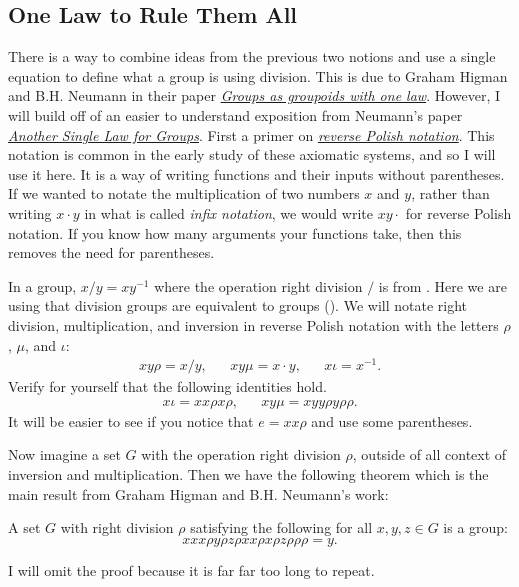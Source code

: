 \documentclass{article}
\begin{document}
\subsection*{One Law to Rule Them All}

There is a way to combine ideas from the previous two notions and use a single equation to define what a group is using division.
This is due to Graham Higman and B.H. Neumann in their paper \href{https://doi.org/10.5486/pmd.1952.2.3-4.10}{\textit{Groups as groupoids with one law}}.
However, I will build off of an easier to understand exposition from Neumann's paper \href{https://doi.org/10.1017/S0004972700006912}{\textit{Another Single Law for Groups}}.
First a primer on \href{https://en.wikipedia.org/wiki/Reverse_Polish_notation}{\emph{reverse Polish notation}}.
This notation is common in the early study of these axiomatic systems, and so I will use it here.
It is a way of writing functions and their inputs without parentheses.
If we wanted to notate the multiplication of two numbers $x$ and $y$, rather than writing $x \cdot y$ in what is called \emph{infix notation}, we would write $x y \cdot$ for reverse Polish notation.
If you know how many arguments your functions take, then this removes the need for parentheses.

In a group, $x / y = x y^{-1}$ where the operation right division $/$ is from .
Here we are using that division groups are equivalent to groups ().
We will notate right division, multiplication, and inversion in reverse Polish notation with the letters $\rho$, $\mu$, and $\iota$:
\begin{align*}
  x y \rho = x / y, && x y \mu = x \cdot y, && x \iota = x^{-1}.
\end{align*}
Verify for yourself that the following identities hold.
\begin{align*}
  x \iota = x x \rho x \rho, && x y \mu = x y y \rho y \rho \rho.
\end{align*}
It will be easier to see if you notice that $e = x x \rho$ and use some parentheses.

Now imagine a set $G$ with the operation right division $\rho$, outside of all context of inversion and multiplication.
Then we have the following theorem which is the main result from Graham Higman and B.H. Neumann's work:
\begin{theorem}
  A set $G$ with right division $\rho$ satisfying the following for all $x, y, z \in G$ is a group:
  \[
    x x x \rho y \rho z \rho x x \rho x \rho z \rho \rho \rho = y.
  \]
\end{theorem}
I will omit the proof because it is far far too long to repeat.
\end{document}
